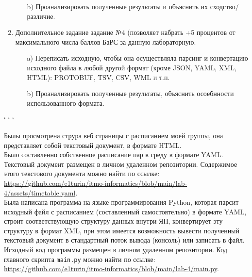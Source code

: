 \begin{enumerate}
\begin{itemize}
        \item[b)] Проанализировать полученные результаты и объяснить их  сходство/различие.
    \end{itemize}
\item Дополнительное задание задание №4 (позволяет набрать +5 процентов  от максимального числа баллов БаРС за данную лабораторную.
    \begin{itemize}
        \item[a)] Переписать исходную, чтобы она осуществляла парсинг и  конвертацию исходного файла в любой другой формат (кроме  JSON, YAML, XML, HTML): PROTOBUF, TSV, CSV, WML и  т.п.
        \item[b)] Проанализировать полученные результаты, объяснить  осоебнности использованного формата.
    \end{itemize}
\end{enumerate}
\begin{center}
    {` ` `}
\end{center}  


\newpage
{}
Былы просмотрена струра веб страницы с расписанием моей группы, она представляет собой текстовый документ, в формате HTML.\\

Было составленно собственное расписание пар в среду в формате YAML.
Текстовый документ размещен в личном удаленном репозитории.  Содержимое этого текстового документа можно найти по ссылке: \url{https://github.com/e1turin/itmo-informatics/blob/main/lab-4/assets/timetable.yaml}.\\


\label{main}
Была написана программа на языке программирования Python, которая парсит исходный файл с расписанием (составленный самостоятельно) в формате YAML, строит соответствующую структуру данных внутри ЯП, конвертирует эту структуру в формат XML, при этом имеется возможность вывести полученный текстовый документ в стандартный поток вывода (консоль) или записать в файл.\\

Исходный код программы размещен в личном удаленном репозитории. 
Код главного скрипта \texttt{main.py} можно найти по ссылке:\\ \url{https://github.com/e1turin/itmo-informatics/blob/main/lab-4/main.py}.\\

